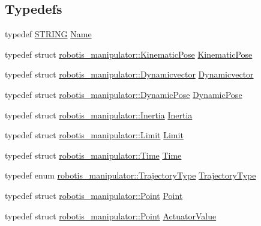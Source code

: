 \subsection*{Typedefs}
\begin{DoxyCompactItemize}
\item 
typedef \hyperlink{robotis__manipulator__log_8h_a67f156408fa9d656017c406fe4f4b330}{S\+T\+R\+I\+NG} \hyperlink{namespacerobotis__manipulator_a08c2d25e77a01ad75b9bb740f8ce4765}{Name}
\item 
typedef struct \hyperlink{structrobotis__manipulator_1_1_kinematic_pose}{robotis\+\_\+manipulator\+::\+Kinematic\+Pose} \hyperlink{namespacerobotis__manipulator_ab1b7bd11d743d22bca6b64b3026d3ff0}{Kinematic\+Pose}
\item 
typedef struct \hyperlink{structrobotis__manipulator_1_1_dynamicvector}{robotis\+\_\+manipulator\+::\+Dynamicvector} \hyperlink{namespacerobotis__manipulator_a5b7433687a9ee2bad6b3340cdf211292}{Dynamicvector}
\item 
typedef struct \hyperlink{structrobotis__manipulator_1_1_dynamic_pose}{robotis\+\_\+manipulator\+::\+Dynamic\+Pose} \hyperlink{namespacerobotis__manipulator_a708cc4bcd2a495ef984c7a733666d088}{Dynamic\+Pose}
\item 
typedef struct \hyperlink{structrobotis__manipulator_1_1_inertia}{robotis\+\_\+manipulator\+::\+Inertia} \hyperlink{namespacerobotis__manipulator_a8c647a7589b972af5f7d31362b334be1}{Inertia}
\item 
typedef struct \hyperlink{structrobotis__manipulator_1_1_limit}{robotis\+\_\+manipulator\+::\+Limit} \hyperlink{namespacerobotis__manipulator_a1b399f654798ff0e3afb533d344d1485}{Limit}
\item 
typedef struct \hyperlink{structrobotis__manipulator_1_1_time}{robotis\+\_\+manipulator\+::\+Time} \hyperlink{namespacerobotis__manipulator_a1a7fc2145859dfbfbb20910e5373b7db}{Time}
\item 
typedef enum \hyperlink{namespacerobotis__manipulator_a008c110bef924df2737c5583000a9293}{robotis\+\_\+manipulator\+::\+Trajectory\+Type} \hyperlink{namespacerobotis__manipulator_adfa0c5066de3b85b33d8998df78f8c0e}{Trajectory\+Type}
\item 
typedef struct \hyperlink{structrobotis__manipulator_1_1_point}{robotis\+\_\+manipulator\+::\+Point} \hyperlink{namespacerobotis__manipulator_a14f99d40e3de0c0cc881b0b94504f99e}{Point}
\item 
typedef struct \hyperlink{structrobotis__manipulator_1_1_point}{robotis\+\_\+manipulator\+::\+Point} \hyperlink{namespacerobotis__manipulator_a26f478d98222f9ce1bf66c7df248037b}{Actuator\+Value}

\end{DoxyCompactItemize}
